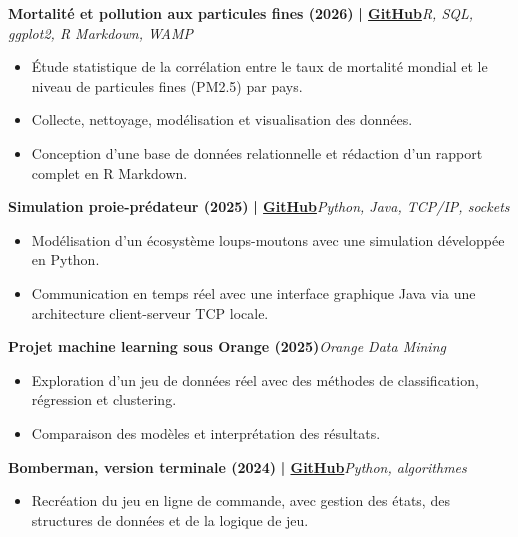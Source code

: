 \documentclass[a4paper]{article}
\begin{document}
    {\textbf{Mortalité et pollution aux particules fines (2026)}}\textbf{ | \href{https://github.com/Ashborn539/projet-SDD-X-BDD}{GitHub}}\hfill{\sl R, SQL, ggplot2, R Markdown, WAMP}\\
          \vspace{-3mm}
\begin{itemize} \itemsep -3pt
\item  Étude statistique de la corrélation entre le taux de mortalité mondial et le niveau de particules fines (PM2.5) par pays.
\item  Collecte, nettoyage, modélisation et visualisation des données.
\item  Conception d'une base de données relationnelle et rédaction d'un rapport complet en R Markdown.
\end{itemize}
          \vspace*{3mm}


        {\textbf{Simulation proie-prédateur (2025)}}\textbf{ | \href{https://github.com/Ashborn539/ecosysteme-proie-predateur}{GitHub}}\hfill{\sl Python, Java, TCP/IP, sockets}\\
          \vspace{-3mm}
\begin{itemize} \itemsep -3pt
\item  Modélisation d'un écosystème loups-moutons avec une simulation développée en Python.
\item  Communication en temps réel avec une interface graphique Java via une architecture client-serveur TCP locale.
\end{itemize}
          \vspace*{3mm}

                {\textbf{Projet machine learning sous Orange (2025)}}\hfill{\sl Orange Data Mining}\\
                    \vspace{-3mm}
\begin{itemize} \itemsep -3pt
\item  Exploration d'un jeu de données réel avec des méthodes de classification, régression et clustering.
\item  Comparaison des modèles et interprétation des résultats.
\end{itemize}
                    \vspace*{3mm}

                {\textbf{Bomberman, version terminale (2024)}}\textbf{ | \href{https://github.com/Ashborn539/terminal-bomberman}{GitHub}}\hfill{\sl Python, algorithmes}\\
                    \vspace{-3mm}
\begin{itemize} \itemsep -3pt
\item  Recréation du jeu en ligne de commande, avec gestion des états, des structures de données et de la logique de jeu.
\end{itemize}

    \ 
    
\end{document}
